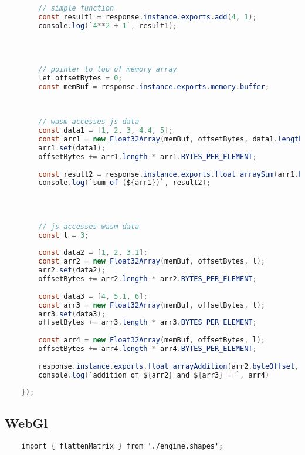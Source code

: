 {\begin{lstlisting}[language=java]
    
        // simple function
        const result1 = response.instance.exports.add(4, 1);
        console.log(`4**2 + 1`, result1);
    
    
    
    
        // pointer to top of memory array
        let offsetBytes = 0;
        const memBuf = response.instance.exports.memory.buffer;
    
    
    
        // wasm accesses js data
        const data1 = [1, 2, 3, 4.4, 5];
        const arr1 = new Float32Array(memBuf, offsetBytes, data1.length);
        arr1.set(data1);
        offsetBytes += arr1.length * arr1.BYTES_PER_ELEMENT;
        
        const result2 = response.instance.exports.float_arraySum(arr1.byteOffset, arr1.length);
        console.log(`sum of (${arr1})`, result2);
    
    
    
    
        // js accesses wasm data
        const l = 3;
    
        const data2 = [1, 2, 3.1];
        const arr2 = new Float32Array(memBuf, offsetBytes, l);
        arr2.set(data2);
        offsetBytes += arr2.length * arr2.BYTES_PER_ELEMENT;
    
        const data3 = [4, 5.1, 6];
        const arr3 = new Float32Array(memBuf, offsetBytes, l);
        arr3.set(data3);
        offsetBytes += arr3.length * arr3.BYTES_PER_ELEMENT;
    
        const arr4 = new Float32Array(memBuf, offsetBytes, l);
        offsetBytes += arr4.length * arr4.BYTES_PER_ELEMENT;
    
        response.instance.exports.float_arrayAddition(arr2.byteOffset, arr3.byteOffset, arr4.byteOffset, l);
        console.log(`addition of ${arr2} and ${arr3} = `, arr4)
        
    });
\end{lstlisting}


\subsection{WebGl}

\begin{lstlisting}
    import { flattenMatrix } from './engine.shapes';


\end{lstlisting}}
